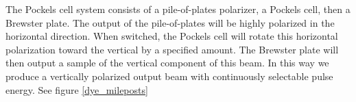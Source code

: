 The Pockels cell system consists of a pile-of-plates polarizer, a Pockels cell, then a Brewster plate. The output of the pile-of-plates will be highly polarized in the horizontal direction. When switched, the Pockels cell will rotate this horizontal polarization toward the vertical by a specified amount. The Brewster plate will then output a sample of the vertical component of this beam. In this way we produce a vertically polarized output beam with continuously selectable pulse energy. See figure \ref{dye_mileposts}

